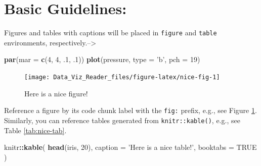 \documentclass[]{book}
\newenvironment{Shaded}{\begin{snugshade}}{\end{snugshade}}
\newcommand{\KeywordTok}[1]{\textcolor[rgb]{0.13,0.29,0.53}{\textbf{#1}}}
\newcommand{\DataTypeTok}[1]{\textcolor[rgb]{0.13,0.29,0.53}{#1}}
\newcommand{\DecValTok}[1]{\textcolor[rgb]{0.00,0.00,0.81}{#1}}
\newcommand{\StringTok}[1]{\textcolor[rgb]{0.31,0.60,0.02}{#1}}
\newcommand{\OtherTok}[1]{\textcolor[rgb]{0.56,0.35,0.01}{#1}}
\newcommand{\OperatorTok}[1]{\textcolor[rgb]{0.81,0.36,0.00}{\textbf{#1}}}
\newcommand{\NormalTok}[1]{#1}
\theoremstyle{definition}
\theoremstyle{definition}
\theoremstyle{definition}
\theoremstyle{remark}
\begin{document}
\section{Basic Guidelines:}\label{basic-guidelines}

Figures and tables with captions will be placed in \texttt{figure} and
\texttt{table} environments, respectively.--\textgreater{}

\begin{Shaded}
\begin{Highlighting}[]
\KeywordTok{par}\NormalTok{(}\DataTypeTok{mar =} \KeywordTok{c}\NormalTok{(}\DecValTok{4}\NormalTok{, }\DecValTok{4}\NormalTok{, .}\DecValTok{1}\NormalTok{, .}\DecValTok{1}\NormalTok{))}
\KeywordTok{plot}\NormalTok{(pressure, }\DataTypeTok{type =} \StringTok{'b'}\NormalTok{, }\DataTypeTok{pch =} \DecValTok{19}\NormalTok{)}
\end{Highlighting}
\end{Shaded}

\begin{figure}

{\centering \texttt{[image: Data\_Viz\_Reader\_files/figure-latex/nice-fig-1]} 

}

\caption{Here is a nice figure!}\label{fig:nice-fig}
\end{figure}

Reference a figure by its code chunk label with the \texttt{fig:}
prefix, e.g., see Figure \ref{fig:nice-fig}. Similarly, you can
reference tables generated from \texttt{knitr::kable()}, e.g., see Table
\ref{tab:nice-tab}.

\begin{Shaded}
\begin{Highlighting}[]
\NormalTok{knitr}\OperatorTok{::}\KeywordTok{kable}\NormalTok{(}
 \KeywordTok{head}\NormalTok{(iris, }\DecValTok{20}\NormalTok{), }\DataTypeTok{caption =} \StringTok{'Here is a nice table!'}\NormalTok{,}
 \DataTypeTok{booktabs =} \OtherTok{TRUE}
\NormalTok{)}
\end{Highlighting}
\end{Shaded}
\end{document}
